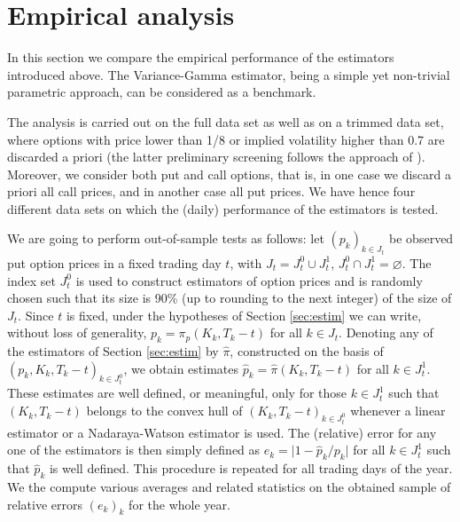 \documentclass[11pt]{article}
\theoremstyle{remark}
\begin{document}


\section{Empirical analysis}
\label{sec:ea}
In this section we compare the empirical performance of the estimators
introduced above. The Variance-Gamma estimator, being a simple yet
non-trivial parametric approach, can be considered as a
benchmark.

The analysis is carried out on the full data set as well as on a
trimmed data set, where options with price lower than 1/8 or implied
volatility higher than 0.7 are discarded a priori (the latter
preliminary screening follows the approach of \cite{AL}). Moreover, we
consider both put and call options, that is, in one case we discard a
priori all call prices, and in another case all put prices. We have
hence four different data sets on which the (daily) performance of the
estimators is tested.

We are going to perform out-of-sample tests as follows: let
$(p_k)_{k\in J_t}$ be observed put option prices in a fixed trading
day $t$, with $J_t=J_t^0 \cup J_t^1$,
$J_t^0 \cap J_t^1 = \varnothing$. The index set $J_t^0$ is used to
construct estimators of option prices and is randomly chosen such that
its size is 90\% (up to rounding to the next integer) of the size of
$J_t$. Since $t$ is fixed, under the hypotheses of Section
\ref{sec:estim} we can write, without loss of generality,
$p_k = \pi_p(K_k,T_k-t)$ for all $k \in J_t$.  Denoting any of the
estimators of Section \ref{sec:estim} by $\hat{\pi}$, constructed on
the basis of $(p_k,K_k,T_k-t)_{k \in J_t^0}$, we obtain estimates
$\hat{p}_k=\hat{\pi}(K_k,T_k-t)$ for all $k \in J_t^1$. These estimates
are well defined, or meaningful, only for those $k \in J_t^1$ such that
$(K_k,T_k-t)$ belongs to the convex hull of $(K_k,T_k-t)_{k\in J_t^0}$
whenever a linear estimator or a Nadaraya-Watson estimator is used.
%
The (relative) error for any one of the estimators is then simply
defined as $e_k = \lvert 1- \hat{p}_k/p_k \rvert$ for all
$k \in J_t^1$ such that $\hat{p}_k$ is well defined. This procedure is
repeated for all trading days of the year. We the compute various
averages and related statistics on the obtained sample of relative
errors $(e_k)_k$ for the whole year.
\end{document}
